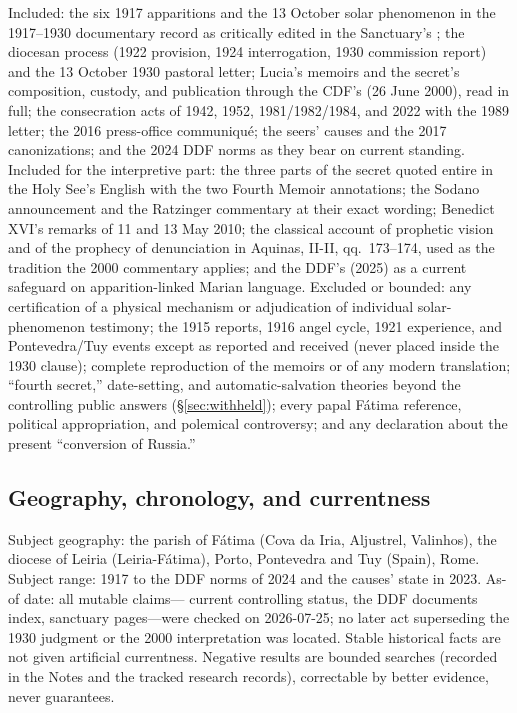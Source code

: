 Included: the six 1917 apparitions and the 13 October solar
phenomenon in the 1917--1930 documentary record as critically edited
in the Sanctuary's ; the diocesan
process (1922 provision, 1924 interrogation, 1930 commission report)
and the 13 October 1930 pastoral letter; Lucia's memoirs and the
secret's composition, custody, and publication through the CDF's
 (26 June 2000), read in full; the
consecration acts of 1942, 1952, 1981/1982/1984, and 2022 with the
1989 letter; the 2016 press-office communiqu\'e; the seers' causes
and the 2017 canonizations; and the 2024 DDF norms as they bear on
current standing. Included for the interpretive part: the three parts
of the secret quoted entire in the Holy See's English with the two
Fourth Memoir annotations; the Sodano announcement and the Ratzinger
commentary at their exact wording; Benedict XVI's remarks of 11 and
13 May 2010; the classical account of prophetic vision and of the
prophecy of denunciation in Aquinas,  II-II,
qq.~173--174, used as the tradition the 2000 commentary applies; and
the DDF's  (2025) as a current safeguard
on apparition-linked Marian language. Excluded or bounded: any
certification of a
physical mechanism or adjudication of individual solar-phenomenon
testimony; the 1915 reports, 1916 angel cycle, 1921 experience, and
Pontevedra/Tuy events except as reported and received (never placed
inside the 1930 clause); complete reproduction of the memoirs or of
any modern translation; ``fourth secret,'' date-setting, and
automatic-salvation theories beyond the controlling public answers
(\S\ref{sec:withheld}); every papal F\'atima reference, political appropriation,
and polemical controversy; and any declaration about the present
``conversion of Russia.''

\subsection*{Geography, chronology, and currentness}

Subject geography: the parish of F\'atima (Cova da Iria, Aljustrel,
Valinhos), the diocese of Leiria (Leiria-F\'atima), Porto, Pontevedra
and Tuy (Spain), Rome. Subject range: 1917 to the DDF norms of 2024
and the causes' state in 2023. As-of date: all mutable claims---
current controlling status, the DDF documents index, sanctuary
pages---were checked on 2026-07-25; no later act superseding the 1930
judgment or the 2000 interpretation was located. Stable historical
facts are not given artificial currentness. Negative results are
bounded searches (recorded in the Notes and the tracked research
records), correctable by better evidence, never guarantees.

